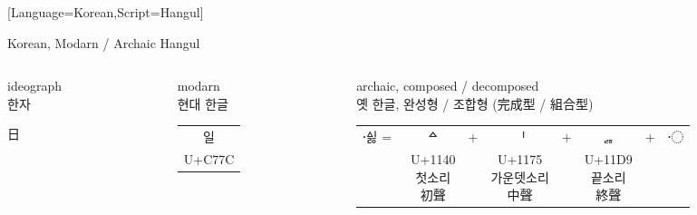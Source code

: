 \documentclass[aspectratio=169,10pt]{beamer}
\newcommand{\colBl}{\color{blue}}
\begin{document}

\setmonofont{Noto Sans Mono CJK KR}[Language=Korean,Script=Hangul]
\begin{frame}[fragile]{Korean, Modarn / Archaic Hangul}
\begin{korean}

\begin{columns}
\begin{column}{18mm}
\begin{block}{\hfil ideograph\hfil\\\hfil\scriptsize 한자\hfil}
\begin{center}
  \LARGE \colBl 日
\end{center}
\end{block}
\end{column}
\begin{column}{18mm}
\begin{block}{\hfil modarn\hfil\\\hfil\scriptsize 현대 한글\hfil}
\begin{center}
\begin{tabular}{c}
  \LARGE {\colBl 일} \\[0.5mm]
  \scriptsize U+C77C
\end{tabular}
\end{center}
\end{block}
\end{column}
\begin{column}{87mm}
\begin{block}{\hfil archaic, composed / decomposed\hfil\\\hfil\scriptsize 옛 한글, 완성형 / 조합형 (完成型 / 組合型)\hfil}
\begin{tabular}{cccccccc}
\multirow{2}{*}{\LARGE{\colBl ᅀᅵᇙ〮} =~} & \Large{\colBl ᅀ} & \multirow{2}{*}{+} & \Large{\colBl ᅵ} & \multirow{2}{*}{+}& \Large{\colBl ᇙ} & \multirow{2}{*}{+} & \Large{\colBl 〮} \\[2mm]
                                & \scriptsize{\parbox[u]{7.8mm}{\hfil U+1140\hfil\\\hspace*{0.8mm}첫소리\\\hspace*{1.7mm}初聲}} &&
                                  \scriptsize{\parbox[u]{11.3mm}{\hfil U+1175\hfil\\가운뎃소리\\\hspace*{2.7mm}中聲}} &&
                                  \scriptsize{\parbox[u]{7.8mm}{\hfil U+11D9\hfil\\\hspace*{0.8mm}끝소리\\\hspace*{1.7mm}終聲}} &&

\end{tabular}
\end{block}
\end{column}
\end{columns}
\end{korean}
\end{frame}
\end{document}
